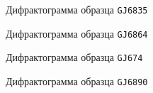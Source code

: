 \begin{figure}[h]
{\centering
  \tiny
  \centering
  
  }
\caption{Дифрактограмма образца \texttt{GJ6835}}
\label{img:difract6835}
\end{figure}


\begin{figure}[h]
{\centering
  \tiny
  \centering
  
  }
\caption{Дифрактограмма образца \texttt{GJ6864}}
\label{img:difract6864}
\end{figure}

\begin{figure}[h]
  {\centering
    \tiny
    \centering
    
    }
\caption{Дифрактограмма образца \texttt{GJ674}}
\label{img:difract6874}
\end{figure}

\begin{figure}[h]
{\centering
  \tiny
  \centering
  
  }
\caption{Дифрактограмма образца \texttt{GJ6890}}
\label{img:difract6890}
\end{figure}